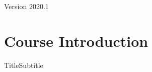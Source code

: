 \documentclass{beamer}
\subtitle[Experimentalism]{Topic 01 - What is an experiment?}
\begin{document}
\begin{frame}
  \maketitle

  \vfill

  \hfill Version 2020.1
\end{frame}

\section{Course Introduction}

\begin{frame}{Title}{Subtitle}
\end{frame}


\end{document}
